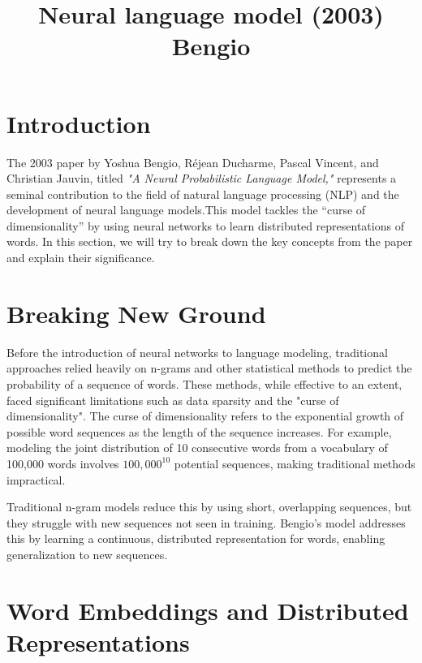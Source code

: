 


\title{Neural language model (2003) Bengio}
\author{}
\date{}
\maketitle

\section*{Introduction}

The 2003 paper by Yoshua Bengio, Réjean Ducharme, Pascal Vincent, and Christian Jauvin, titled \textit{"A Neural Probabilistic Language Model,"} represents a seminal contribution to the field of natural language processing (NLP) and the development of neural language models.This model tackles the “curse of dimensionality” by using neural networks to learn distributed representations of words. In this section, we will try to break down the key concepts from the paper and explain their significance.

\section*{Breaking New Ground}

Before the introduction of neural networks to language modeling, traditional approaches relied heavily on n-grams and other statistical methods to predict the probability of a sequence of words. These methods, while effective to an extent, faced significant limitations such as data sparsity and the "curse of dimensionality". The curse of dimensionality refers to the exponential growth of possible word sequences as the length of the sequence increases. For example, modeling the joint distribution of 10 consecutive words from a vocabulary of 100,000 words involves $100,000^{10}$ potential sequences, making traditional methods impractical.

Traditional n-gram models reduce this by using short, overlapping sequences, but they struggle with new sequences not seen in training. Bengio’s model addresses this by learning a continuous, distributed representation for words, enabling generalization to new sequences.
\section*{Word Embeddings and Distributed Representations}

